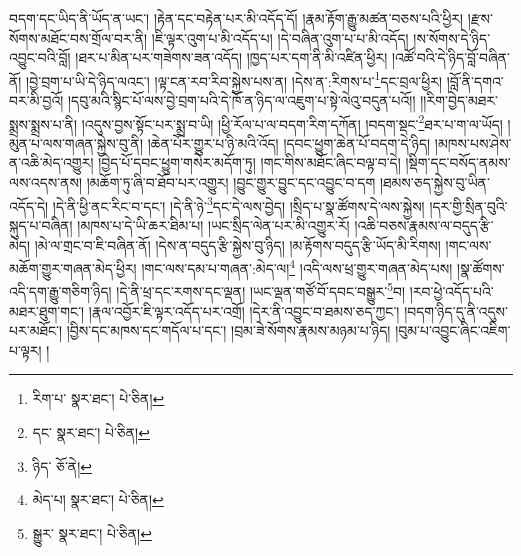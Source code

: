 བདག་དང་ཡིད་ནི་ཡོད་ན་ཡང་། །རྟེན་དང་བརྟེན་པར་མི་འདོད་དོ། །རྣམ་རྟོག་རྒྱུ་མཚན་བཅས་པའི་ཕྱིར། །རྫས་སོགས་མཐོང་བས་གྲོལ་བར་ནི། །ཇི་ལྟར་འུག་པ་མི་འདོད་པ། །དེ་བཞིན་འུག་པ་པ་མི་འདོད། །ས་སོགས་དེ་ཉིད་འབྱུང་བའི་བློ། །ཐར་པ་མིན་པར་གཟེགས་ཟན་འདོད། །ཁྱད་པར་དག་ནི་མི་འཛིན་ཕྱིར། །འཚོ་བའི་དེ་ཉིད་བློ་བཞིན་ནོ། །བྱེ་བྲག་པ་ཡི་དེ་ཉིད་ལའང་། །ལྟ་ངན་རབ་རིབ་སྐྱེས་པས་ན། །དེས་ན་:རིགས་པ་\footnote{རིག་པ་  སྣར་ཐང་།  པེ་ཅིན། }དང་བྲལ་ཕྱིར། །བློ་ནི་དགའ་བར་མི་བྱའོ། །དབུ་མའི་སྙིང་པོ་ལས་བྱེ་བྲག་པའི་དེ་ཁོ་ན་ཉིད་ལ་འཇུག་པ་སྟེ་ལེའུ་བདུན་པའོ།། །།རིག་བྱེད་མཐར་སྨྲས་སྨྲས་པ་ནི། །འདུས་བྱས་སྟོང་པར་སྨྲ་བ་ཡི། །ཕྱི་རོལ་པ་ལ་བདག་རིག་དཀོན། །བདག་སྡང་\footnote{དང་  སྣར་ཐང་།  པེ་ཅིན། }ཐར་པ་ག་ལ་ཡོད། །མུན་པ་ལས་གཞན་སྐྱེས་བུ་ནི། །ཆེན་པོར་གྱུར་པ་ཉི་མའི་འོད། །དབང་ཕྱུག་ཆེན་པོ་བདག་དེ་ཉིད། །མཁས་པས་ཤེས་ན་འཆི་མེད་འགྱུར། །བྱེད་པོ་དབང་ཕྱུག་གསེར་མདོག་ཏུ། །གང་གིས་མཐོང་ཞིང་བལྟ་བ་དེ། །སྡིག་དང་བསོད་ནམས་ལས་འདས་ནས། །མཆོག་ཏུ་ཞི་བ་ཐོབ་པར་འགྱུར། །བྱུང་གྱུར་བྱུང་དང་འབྱུང་བ་དག །ཐམས་ཅད་སྐྱེས་བུ་ཡིན་འདོད་དེ། །དེ་ནི་ཕྱི་ནང་རིང་བ་དང་། །དེ་ནི་ཉེ་\footnote{ཉིད་  ཅོ་ནེ། }དང་དེ་ལས་བྱེད། །སྲིད་པ་སྣ་ཚོགས་དེ་ལས་སྐྱེས། །དར་གྱི་སྲིན་བུའི་སྐུད་པ་བཞིན། །མཁས་པ་དེ་ཡི་ཆར་ཐིམ་པ། །ཡང་སྲིད་ལེན་པར་མི་འགྱུར་རོ། །འཆི་བཅས་རྣམས་ལ་བདུད་རྩི་མེད། །མེ་ལ་གྲང་བ་ཇི་བཞིན་ནོ། །དེས་ན་བདུད་རྩི་སྐྱེས་བུ་ཉིད། །མ་རྟོགས་བདུད་རྩི་ཡོད་མི་རིགས། །གང་ལས་མཆོག་གྱུར་གཞན་མེད་ཕྱིར། །གང་ལས་དམ་པ་གཞན་:མེད་ལ།\footnote{མེད་པ།  སྣར་ཐང་།  པེ་ཅིན། } །འདི་ལས་ཕྲ་གྱུར་གཞན་མེད་པས། །སྣ་ཚོགས་འདི་དག་རྒྱུ་གཅིག་ཉིད། །དེ་ནི་ཕྲ་དང་རགས་དང་ལྡན། །ཡང་ལྡན་གཙོ་བོ་དབང་བསྒྱུར་\footnote{སྒྱུར་  སྣར་ཐང་།  པེ་ཅིན། }བ། །རབ་ཕྱེ་འདོད་པའི་མཐར་ཐུག་གང་། །རྣལ་འབྱོར་ཇི་ལྟར་འདོད་པར་འགྲོ། །དེར་ནི་འབྱུང་བ་ཐམས་ཅད་ཀྱང་། །བདག་ཉིད་དུ་ནི་འདུས་པར་མཐོང་། །བྱིས་དང་མཁས་དང་གདོལ་པ་དང་། །བྲམ་ཟེ་སོགས་རྣམས་མཉམ་པ་ཉིད། །བུམ་པ་འབྱུང་ཞིང་འཇིག་པ་ལྟར། །
